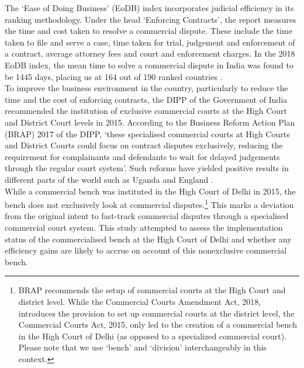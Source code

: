 \documentclass[a4paper, 12pt, twoside]{article}
\begin{document}
The ‘Ease of Doing Business’ (EoDB) index incorporates judicial efficiency in its ranking methodology. Under the head ‘Enforcing Contracts’, the report measures the time and cost taken to resolve a commercial dispute. These include the time taken to file and serve a case, time taken for trial, judgement and enforcement of a contract, average attorney fees and court and enforcement charges. In the 2018 EoDB index, the mean time to solve a commercial dispute in India was found to be 1445 days, placing us at 164 out of 190 ranked countries \parencite{DBreport}.\\

To improve the business environment in the country, particularly to reduce the time and the cost of enforcing contracts, the DIPP of the Government of India recommended the institution of exclusive commercial courts at the High Court and District Court levels in 2015. According to the Business Reform Action Plan (BRAP) 2017 of the DIPP, ‘these specialised commercial courts at High Courts and District Courts could focus on contract disputes exclusively, reducing the requirement for complainants and defendants to wait for delayed judgements through the regular court system’. Such reforms have yielded positive results in different parts of the world such as Uganda and England \parencite{ugandapaper, applebaumpapers, guilianareport}. \\

While a commercial bench was instituted in the High Court of Delhi in 2015, the bench does not exclusively look at commercial disputes.\footnote{BRAP recommends the setup of commercial courts at the High Court and district level. While the Commercial Courts Amendment Act, 2018, introduces the provision to set up commercial courts at the district level, the Commercial Courts Act, 2015, only led to the creation of a commercial bench in the High Court of Delhi (as opposed to a specialized commercial court). Please note that we use ‘bench’ and ‘division’ interchangeably in this context.} This marks a deviation from the original intent to fast-track commercial disputes through a specialised commercial court system. This study attempted to assess the implementation status of the commercialised bench at the High Court of Delhi and whether any efficiency gains are likely to accrue on account of this nonexclusive commercial bench. \\
\end{document}
